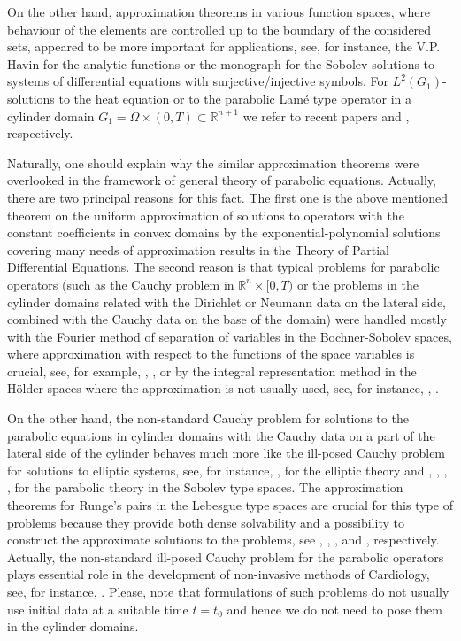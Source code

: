 \documentclass{amsart}
\theoremstyle{definition}
\theoremstyle{remark}
\numberwithin{equation}{section}
\begin{document}
On the other hand,  approximation theorems in various function spaces, where behaviour of the 
elements are controlled up to the boundary of the considered sets, appeared to be more 
important for applications, see, for instance,  the  V.P. Havin \cite{H68} for the analytic 
functions or the monograph \cite[Ch. 5--8]{Tark36} for the Sobolev solutions to systems of 
differential equations with surjective/injective symbols. For $L^2(G_1)$-solutions to the heat 
equation or to the parabolic Lam\'e type operator in a cylinder domain $G_1=\Omega \times (0,T) 
\subset {\mathbb R}^{n+1} $ we refer to recent papers \cite{ShHeat} and \cite{VKShLame}, respectively.

Naturally, one should explain why the similar approximation theorems were overlooked in 
the framework of general theory of parabolic equations. Actually, there are two principal 
reasons for this fact. The first one is the above mentioned theorem on the uniform 
approximation of solutions to operators with the constant coefficients in convex domains by the 
exponential-polynomial solutions covering many needs of approximation results in the Theory of 
Partial Differential Equations. The second reason is that typical problems for parabolic 
operators (such as the Cauchy problem in ${\mathbb R}^n \times [0,T)$ or the problems in the 
cylinder domains related with the Dirichlet or Neumann data on the lateral side, combined with 
the Cauchy data on the base of the domain) were handled mostly with the Fourier method of 
separation of variables in the Bochner-Sobolev spaces,  where approximation with respect to 
the functions of the space variables is crucial, see, for example, \cite{Lion69}, 
\cite{Tema79}, or by the integral representation method in the H\"older spaces where the 
approximation is not usually used, see, for instance, \cite{frid}, \cite{LadSoUr67}. 

On the other hand, the non-standard Cauchy problem for solutions to the parabolic equations 
in cylinder domains with the Cauchy data on a part of the lateral side of the cylinder 
behaves much more like the ill-posed Cauchy problem for solutions to elliptic systems, see, 
for instance, \cite{ShTaLMS}, \cite[Ch. 10]{Tark36} for the elliptic theory and \cite{KuSh}, 
\cite{MMT17}, \cite{VKShLame}, \cite{PuSh15}, for the parabolic theory in the Sobolev type 
spaces. The approximation theorems for Runge's pairs in the Lebesgue type spaces are crucial 
for this type of problems because they provide both dense solvability  and a  
possibility to construct the approximate solutions to the problems, see \cite{Merg56}, 
\cite{MaHa74}, \cite[Theorem 7.6]{ShTaLMS}, and  \cite[Corollary 3.5]{VKShLame}, 
respectively. Actually, the non-standard ill-posed Cauchy problem for the parabolic operators 
plays essential role in the development of non-invasive methods of Cardiology, see, for 
instance, \cite[\S 4]{KSU_ZAMM}. Please, note that formulations of such problems do not 
usually use initial data at a suitable time $t=t_0$ and hence we do not need to pose them in 
the cylinder domains.  
\end{document}
